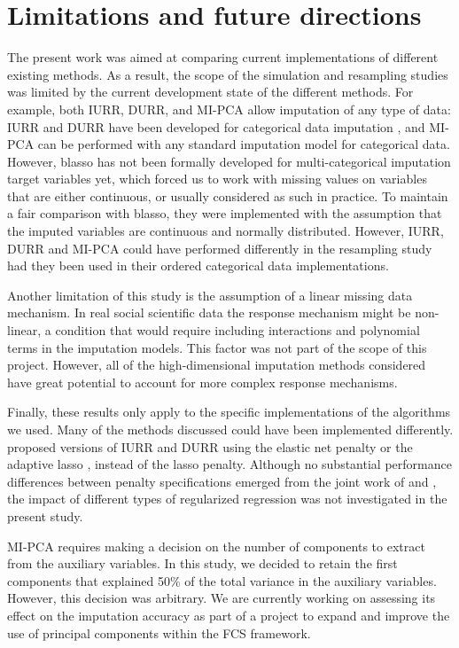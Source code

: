 \section{Limitations and future directions}

	The present work was aimed at comparing current implementations of different existing methods.
	As a result, the scope of the simulation and resampling studies was limited by the current development state of 
	the different methods.
	For example, both IURR, DURR, and MI-PCA allow imputation of any type of data:
	IURR and DURR have been developed for categorical data imputation \citep{dengEtAl:2016},
	and MI-PCA can be performed with any standard imputation model for categorical data.
	However, blasso has not been formally developed for multi-categorical imputation target variables yet, 
	which forced us to work with missing values on variables that are either continuous, or usually 
	considered as such in practice.
	To maintain a fair comparison with blasso, they were implemented with the assumption that the imputed 
	variables are continuous and normally distributed.
	However, IURR, DURR and MI-PCA could have performed differently in the resampling study had they been used in their
	ordered categorical data implementations.

	Another limitation of this study is the assumption of a linear missing data mechanism.
	In real social scientific data the response mechanism might be non-linear, a condition that would require
	including interactions and polynomial terms in the imputation models.
	This factor was not part of the scope of this project. 
	However, all of the high-dimensional imputation methods considered have great potential to account for
	more complex response mechanisms.

	Finally, these results only apply to the specific implementations of the algorithms we used. 
	Many of the methods discussed could have been implemented differently.
	\cite{zhaoLong:2016} proposed versions of IURR and DURR using the elastic net penalty \citep{zouHastie:2005} or 
	the adaptive lasso \citep{zou:2006}, instead of the lasso penalty.
	Although no substantial performance differences between penalty specifications emerged 
	from the joint work of \cite{zhaoLong:2016} and \cite{dengEtAl:2016}, the impact of different types of 
	regularized regression was not investigated in the present study. 

	MI-PCA requires making a decision on the number of components to extract from the auxiliary 
	variables.
	In this study, we decided to retain the first components that explained 50\% of the total variance in the 
	auxiliary variables.
	However, this decision was arbitrary. 
	We are currently working on assessing its effect on the imputation accuracy as part of a project to 
	expand and improve the use of principal components within the FCS framework.

